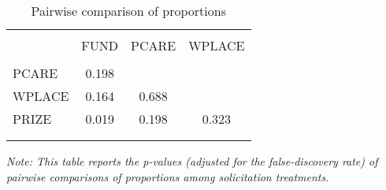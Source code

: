 \begin{table}
\centering
\caption{Pairwise comparison of proportions}
\label{pairwise.fdr}
\begin{tabular}{@{}lccc}
  \\[-1.8ex]\hline \hline \\[-1.8ex]
 & FUND & PCARE & WPLACE \\ 
  \hline \\[-1.86ex]
PCARE & 0.198 &  &  \\ 
  WPLACE & 0.164 & 0.688 &  \\ 
  PRIZE & 0.019 & 0.198 & 0.323 \\ 
   \\[-1.8ex]\hline \hline \\[-1.8ex]
\end{tabular}
\begin{minipage}{\textwidth}\itshape\footnotesize
Note: This table reports the p-values (adjusted for the false-discovery rate)
						        of pairwise comparisons of proportions among solicitation treatments.
\end{minipage}
\end{table}
